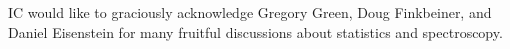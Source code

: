 \documentclass[preprint]{aastex} %
\begin{document}
\acknowledgments
IC would like to graciously acknowledge Gregory Green, Doug Finkbeiner, and Daniel Eisenstein for many fruitful discussions about statistics and spectroscopy. 

%
%



\end{document}
